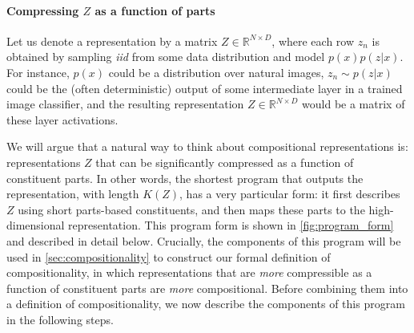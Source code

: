 \documentclass{article} %
\begin{document}
\paragraph{Compressing $Z$ as a function of parts}

Let us denote a representation by a matrix $Z \in \mathbb{R}^{N \times D}$, where each row $z_n$ is obtained by sampling \textit{iid} from some data distribution and model $p(x)p(z|x)$. For instance, $p(x)$ could be a distribution over natural images, $z_n \sim p(z|x)$ could be the (often deterministic) output of some intermediate layer in a trained image classifier, and the resulting representation $Z \in \mathbb{R}^{N \times D}$ would be a matrix of these layer activations.

We will argue that a natural way to think about compositional representations is: representations $Z$ that can be significantly compressed as a function of constituent parts. In other words, the shortest program that outputs the representation, with length $K(Z)$, has a very particular form: it first describes $Z$ using short parts-based constituents, and then maps these parts to the high-dimensional representation. This program form is shown in \cref{fig:program_form} and described in detail below. Crucially, the components of this program will be used in \cref{sec:compositionality} to construct our formal definition of compositionality, in which representations that are \emph{more} compressible as a function of constituent parts are \emph{more} compositional. Before combining them into a definition of compositionality, we now describe the components of this program in the following steps.
\end{document}
